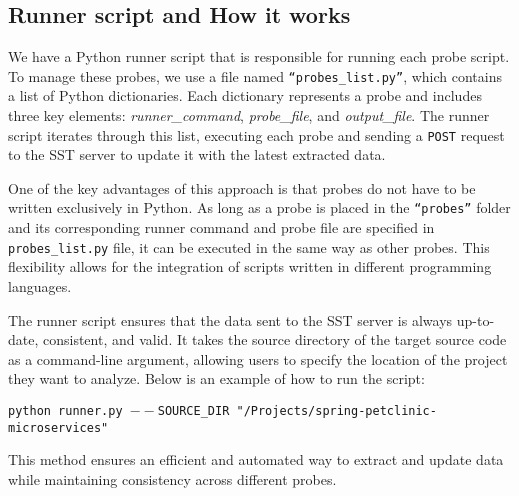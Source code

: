 \subsection{Runner script and How it works}

We have a Python runner script that is responsible for running each probe script. To manage these probes, we use a file named \texttt{``probes\_list.py''}, which contains a list of Python dictionaries. Each dictionary represents a probe and includes three key elements: \textit{runner\_command}, \textit{probe\_file}, and \textit{output\_file}. The runner script iterates through this list, executing each probe and sending a \texttt{POST} request to the SST server to update it with the latest extracted data.  

One of the key advantages of this approach is that probes do not have to be written exclusively in Python. As long as a probe is placed in the \texttt{``probes''} folder and its corresponding runner command and probe file are specified in \texttt{probes\_list.py} file, it can be executed in the same way as other probes. This flexibility allows for the integration of scripts written in different programming languages.  

The runner script ensures that the data sent to the SST server is always up-to-date, consistent, and valid. It takes the source directory of the target source code as a command-line argument, allowing users to specify the location of the project they want to analyze. Below is an example of how to run the script:

\begin{tcolorbox}[colback=gray!10, colframe=gray!20]
    \texttt{python runner.py \newline ${--}$SOURCE\_DIR "/Projects/spring-petclinic-microservices"}
\end{tcolorbox}

This method ensures an efficient and automated way to extract and update data while maintaining consistency across different probes.